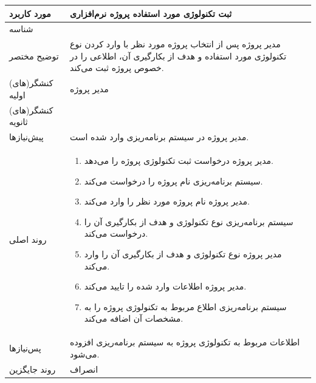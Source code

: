 \begin{table}[H]
	\centering
	\begin{tabular}{|p{3cm}|p{10cm}|}
		\hline
		
		
		مورد کاربرد	& ثبت تکنولوژی‌ مورد استفاده پروژه نرم‌افزاری  \\
		\hline
		
		شناسه & 
		\stepcounter{usecase_ID}
		
		\arabic{usecase_ID} \\
		
		\hline
		
		توضیح مختصر & مدیر پروژه پس از انتخاب پروژه مورد نظر با وارد کردن نوع تکنولوژی مورد استفاده و هدف از بکارگیری آن، اطلاعی را در خصوص پروژه ثبت می‌کند. \\
		\hline
		
		کنشگر(های) اولیه& مدیر پروژه \\
		\hline
		
		کنشگر(های) ثانویه&  \\
		\hline
		
		پیش‌نیازها
		& مدیر پروژه در سیستم برنامه‌ریزی وارد شده است.\\
		
		\hline
		
		
		روند اصلی &
		\begin{enumerate}[topsep=0cm,leftmargin=0.5cm]
			\item مدیر پروژه درخواست ثبت تکنولوژی پروژه را می‌دهد.
			\item سیستم برنامه‌ریزی نام پروژه را درخواست می‌کند.
			\item مدیر پروژه نام پروژه مورد نظر را وارد می‌کند.
			\item سیستم برنامه‌ریزی نوع تکنولوژی و هدف از بکارگیری آن را درخواست می‌کند.
			\item مدیر پروژه نوع تکنولوژی و هدف از بکارگیری آن را وارد می‌کند.
			\item مدیر پروژه اطلاعات وارد شده را تایید می‌کند.
			\item سیستم برنامه‌ریزی اطلاع مربوط به تکنولوژی پروژه را به مشخصات آن اضافه می‌کند.
		\end{enumerate}	\\
		\hline
		
		پس‌نیازها &
		اطلاعات مربوط به تکنولوژی پروژه به سیستم برنامه‌ریزی افزوده می‌شود. \\
		\hline
		
		روند جایگزین
		& انصراف \\
		\hline
		
	\end{tabular}
\end{table}



